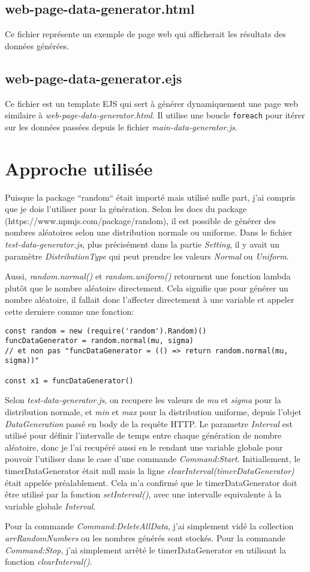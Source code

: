 \documentclass{article}
\begin{document}
\subsection{web-page-data-generator.html}
Ce fichier représente un exemple de page web qui afficherait les résultats des données générées.

\subsection{web-page-data-generator.ejs}
Ce fichier est un template EJS qui sert à générer dynamiquement une page web similaire à \textit{web-page-data-generator.html}. Il utilise une boucle \texttt{foreach} pour itérer sur les données passées depuis le fichier \textit{main-data-generator.js}.


\section{Approche utilisée}

Puisque la package ``random`` était importé mais utilisé nulle part, j'ai compris que je dois l'utiliser pour la génération.
Selon les docs du package (https://www.npmjs.com/package/random), il est possible de générer des nombres aléatoires selon une distribution normale ou uniforme.
Dans le fichier \textit{test-data-generator.js}, plus précisément dans la partie \textit{Setting}, il y avait un paramètre \textit{DistributionType} qui peut prendre les valeurs \textit{Normal} ou \textit{Uniform}.

Aussi, \textit{random.normal()} et \textit{random.uniform()} retournent une fonction lambda plutôt que le nombre aléatoire directement. Cela signifie que pour générer un nombre aléatoire, il fallait donc l'affecter directement à une variable et appeler cette derniere comme une fonction:
\begin{verbatim}
const random = new (require('random').Random)()
funcDataGenerator = random.normal(mu, sigma)
// et non pas "funcDataGenerator = (() => return random.normal(mu, sigma))"

const x1 = funcDataGenerator()
\end{verbatim}

Selon \textit{test-data-generator.js}, on recupere les valeurs de \textit{mu} et \textit{sigma} pour la distribution normale, et \textit{min} et \textit{max} pour la distribution uniforme, depuis l'objet \textit{DataGeneration} passé en body de la requête HTTP.
Le parametre \textit{Interval} est utilisé pour définir l'intervalle de temps entre chaque génération de nombre aléatoire, donc je l'ai recupéré aussi en le rendant une variable globale pour pouvoir l'utiliser dans le case d'une commande \textit{Command:Start}.
Initiallement, le timerDataGenerator était null mais la ligne \textit{clearInterval(timerDataGenerator)} était appelée préalablement. Cela m'a confirmé que le timerDataGenerator doit être utilisé par la fonction \textit{setInterval()}, avec une intervalle equivalente à la variable globale \textit{Interval}.

Pour la commande \textit{Command:DeleteAllData}, j'ai simplement vidé la collection \textit{arrRandomNumbers} ou les nombres générés sont stockés.
Pour la commande \textit{Command:Stop}, j'ai simplement arrêté le timerDataGenerator en utilisant la fonction \textit{clearInterval()}.
\end{document}
